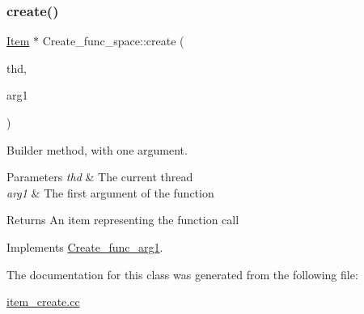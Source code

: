 \subsubsection{\texorpdfstring{create()}{create()}}
{\footnotesize\ttfamily \mbox{\hyperlink{classItem}{Item}} $\ast$ Create\+\_\+func\+\_\+space\+::create (\begin{DoxyParamCaption}\item[{T\+HD $\ast$}]{thd,  }\item[{\mbox{\hyperlink{classItem}{Item}} $\ast$}]{arg1 }\end{DoxyParamCaption})\hspace{0.3cm}{\ttfamily [virtual]}}

Builder method, with one argument. 
\begin{DoxyParams}{Parameters}
{\em thd} & The current thread \\
\hline
{\em arg1} & The first argument of the function \\
\hline
\end{DoxyParams}
\begin{DoxyReturn}{Returns}
An item representing the function call 
\end{DoxyReturn}


Implements \mbox{\hyperlink{classCreate__func__arg1_a3e9a98f755cd82c3e762e334c955a8c9}{Create\+\_\+func\+\_\+arg1}}.



The documentation for this class was generated from the following file\+:\begin{DoxyCompactItemize}
\item 
\mbox{\hyperlink{item__create_8cc}{item\+\_\+create.\+cc}}\end{DoxyCompactItemize}
